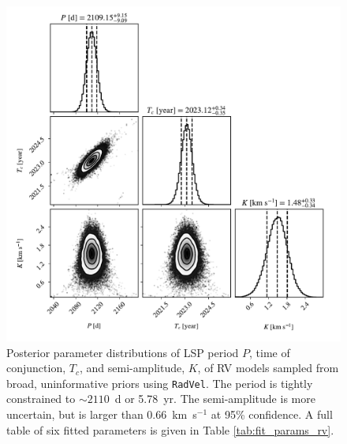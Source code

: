 \documentclass[twocolumn]{aastex631}
\begin{document}
\begin{figure}
    \centering
    \includegraphics[width=\linewidth]{figures/corner_mcmc_synth.pdf}
    \caption{Posterior parameter distributions of LSP period $P$, time of conjunction, $T_c$, and semi-amplitude, $K$, of RV models sampled from broad, uninformative priors using {\tt RadVel}. The period is tightly constrained to $\sim 2110$~d or 5.78~yr. The semi-amplitude is more uncertain, but is larger than 0.66~km~s$^{-1}$ at 95\% confidence.  A full table of six fitted parameters is given in Table \ref{tab:fit_params_rv}.  }
    \label{fig:RVcorner}
\end{figure}
\end{document}
